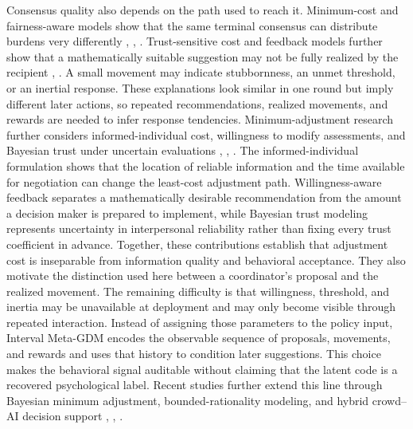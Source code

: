 \documentclass[journal]{IEEEtran}
\begin{document}
Consensus quality also depends on the path used to reach it. Minimum-cost and fairness-aware models show that the same terminal consensus can distribute burdens very differently \cite{ref7}, \cite{ref8}, \cite{ref20}. Trust-sensitive cost and feedback models further show that a mathematically suitable suggestion may not be fully realized by the recipient \cite{ref12}, \cite{ref26}. A small movement may indicate stubbornness, an unmet threshold, or an inertial response. These explanations look similar in one round but imply different later actions, so repeated recommendations, realized movements, and rewards are needed to infer response tendencies. Minimum-adjustment research further considers informed-individual cost, willingness to modify assessments, and Bayesian trust under uncertain evaluations \cite{tfsLiang2022}, \cite{tfsZhang2022}, \cite{tfsDai2024}. The informed-individual formulation shows that the location of reliable information and the time available for negotiation can change the least-cost adjustment path. Willingness-aware feedback separates a mathematically desirable recommendation from the amount a decision maker is prepared to implement, while Bayesian trust modeling represents uncertainty in interpersonal reliability rather than fixing every trust coefficient in advance. Together, these contributions establish that adjustment cost is inseparable from information quality and behavioral acceptance. They also motivate the distinction used here between a coordinator's proposal and the realized movement. The remaining difficulty is that willingness, threshold, and inertia may be unavailable at deployment and may only become visible through repeated interaction. Instead of assigning those parameters to the policy input, Interval Meta-GDM encodes the observable sequence of proposals, movements, and rewards and uses that history to condition later suggestions. This choice makes the behavioral signal auditable without claiming that the latent code is a recovered psychological label. Recent studies further extend this line through Bayesian minimum adjustment, bounded-rationality modeling, and hybrid crowd--AI decision support \cite{ref28}, \cite{ref29}, \cite{ref30}.
\end{document}
